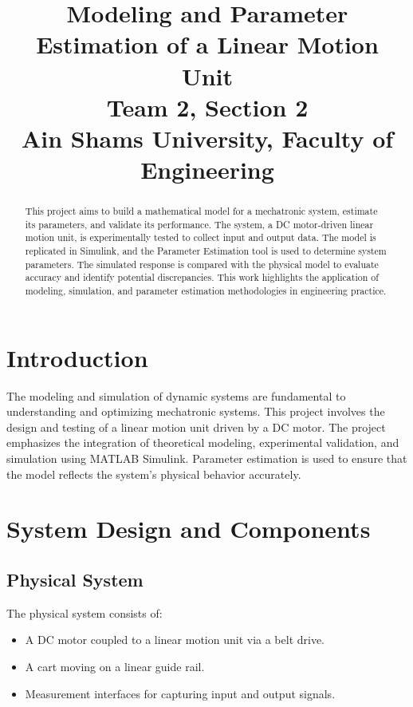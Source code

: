 \documentclass[conference]{IEEEtran}
\begin{document}
\title{Modeling and Parameter Estimation of a Linear Motion Unit\\
\bigskip
{\Large \textbf{Team 2, Section 2}} \\ %
\textbf{Ain Shams University, Faculty of Engineering} %
}

\author{}

\maketitle

\begin{abstract}
This project aims to build a mathematical model for a mechatronic system, estimate its parameters, and validate its performance. The system, a DC motor-driven linear motion unit, is experimentally tested to collect input and output data. The model is replicated in Simulink, and the Parameter Estimation tool is used to determine system parameters. The simulated response is compared with the physical model to evaluate accuracy and identify potential discrepancies. This work highlights the application of modeling, simulation, and parameter estimation methodologies in engineering practice.
\end{abstract}

\section{Introduction}
The modeling and simulation of dynamic systems are fundamental to understanding and optimizing mechatronic systems. This project involves the design and testing of a linear motion unit driven by a DC motor. The project emphasizes the integration of theoretical modeling, experimental validation, and simulation using MATLAB Simulink. Parameter estimation is used to ensure that the model reflects the system's physical behavior accurately.

\section{System Design and Components}
\subsection{Physical System}
The physical system consists of:
\begin{itemize}
    \item A DC motor coupled to a linear motion unit via a belt drive.
    \item A cart moving on a linear guide rail.
    \item Measurement interfaces for capturing input and output signals.
\end{itemize}
\end{document}
